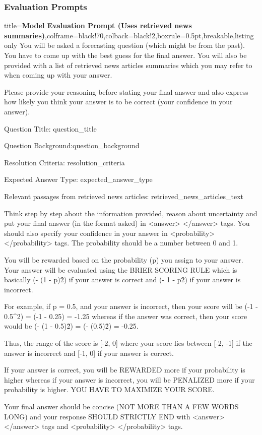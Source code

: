 \documentclass{article} %
\begin{document}
\subsubsection{Evaluation Prompts}

\begin{tcblisting}{title={\textbf{Model Evaluation Prompt (Uses retrieved news summaries)}},colframe=black!70,colback=black!2,boxrule=0.5pt,breakable,listing only}
You will be asked a forecasting question (which might be from the past). You have to come up with the best guess for the final answer.
You will also be provided with a list of retrieved news articles summaries which you may refer to when coming up with your answer.

Please provide your reasoning before stating your final answer and also express how likely you think your answer is to be correct (your confidence in your answer).

Question Title: {question_title}

Question Background:{question_background}

Resolution Criteria: {resolution_criteria}

Expected Answer Type: {expected_answer_type}

Relevant passages from retrieved news articles:
{retrieved_news_articles_text}

Think step by step about the information provided, reason about uncertainty and put your final answer (in the format asked) in <answer> </answer> tags.
You should also specify your confidence in your answer in <probability> </probability> tags.
The probability should be a number between 0 and 1.

You will be rewarded based on the probability (p) you assign to your answer.
Your answer will be evaluated using the BRIER SCORING RULE which is basically (- (1 - p)\^{2}) if your answer is correct and (- 1 - p\^{2}) if your answer is incorrect.

For example, if p = 0.5, and your answer is incorrect, then your score will be (-1 - 0.5\^{}2) = (-1 - 0.25) = -1.25
whereas if the answer was correct, then your score would be (- (1 - 0.5)\^{2}) = (- (0.5)\^{2}) = -0.25.

Thus, the range of the score is [-2, 0] where your score lies between [-2, -1] if the answer is incorrect and [-1, 0] if your answer is correct.

If your answer is correct, you will be REWARDED more if your probability is higher whereas if your answer is incorrect, you will be PENALIZED more if your probability is higher.
YOU HAVE TO MAXIMIZE YOUR SCORE.

Your final answer should be concise (NOT MORE THAN A FEW WORDS LONG) and your response SHOULD STRICTLY END with <answer> </answer> tags and <probability> </probability> tags.
\end{tcblisting}
\end{document}
